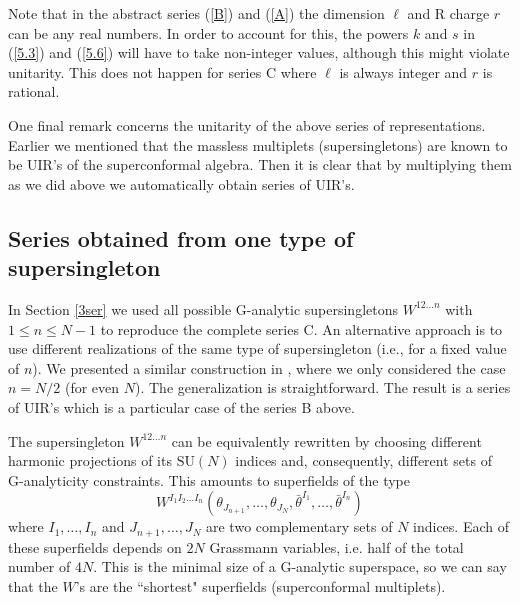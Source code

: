 \documentclass[a4paper,12pt]{article}
\begin{document}
Note that in the abstract series (\ref{B}) and (\ref{A}) the 
dimension $\ell$ and R charge $r$ can be any real numbers. In 
order to account for this, the powers $k$ and $s$ in (\ref{5.3}) 
and (\ref{5.6}) will have to take non-integer values, although 
this might violate unitarity. This does not happen for series C 
where $\ell$ is always integer and $r$ is rational. 

One final remark concerns the unitarity of the above series of 
representations. Earlier we mentioned that the massless multiplets 
(supersingletons) are known to be UIR's of the superconformal 
algebra. Then it is clear that by multiplying them as we did above 
we automatically obtain series of UIR's. 

\subsection{Series obtained from one type of supersingleton}

In Section \ref{3ser} we used all possible G-analytic 
supersingletons $W^{12\ldots n}$ with $1\leq n\leq N-1$ to 
reproduce the complete series C. An alternative approach is to 
use different realizations of the same type of supersingleton 
(i.e., for a fixed value of $n$). We presented a similar 
construction in \cite{FS1}, where we only considered the case 
$n=N/2$ (for even $N$). The generalization is straightforward. The 
result is a series of UIR's which is a particular case of the 
series B above. 

The supersingleton $W^{12\ldots n}$ can be equivalently rewritten 
by choosing different harmonic projections of its $\mbox{SU}(N)$ 
indices and, consequently, different sets of G-analyticity 
constraints. This amounts to superfields of the type  
\begin{equation}\label{5.8}
  W^{I_1I_2\ldots I_n}
(\theta_{J_{n+1}},\ldots, \theta_{J_N}, 
\bar\theta^{I_1},\ldots,\bar\theta^{I_n}) 
\end{equation}
where $I_1,\dots,I_n$ and $J_{n+1},\dots,J_N$ are two 
complementary sets of $N$ indices. Each of these superfields 
depends on $2N$ Grassmann variables, i.e. half of the total number 
of $4N$. This is the minimal size of a G-analytic superspace, so 
we can say that the $W$'s are the ``shortest" superfields 
(superconformal multiplets). 
\end{document}
